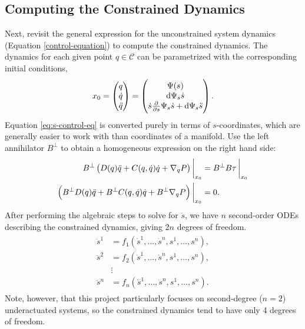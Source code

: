 \documentclass[main.tex]{subfiles}
\begin{document}
\subsection{Computing the Constrained Dynamics}
Next, revisit the general expression for the unconstrained system dynamics (Equation \ref{control-equation}) to compute the constrained dynamics. 
The dynamics for each given point $q\in\mathcal{C}$ can be parametrized with the corresponding initial conditions,
\begin{align}
x_0=\pmqty{q\\\qd\\\qdd}=\pmqty{
\Psi(s)\\
\dd\Psi_s\dot{s}\\
\dot{s}\pdv{}{s}\Psi_s\dot{s}+\dd\Psi_s\ddot{s}
}.
\end{align}
Equation \ref{eq:s-control-eq} is converted purely in terms of $s$-coordinates, which are generally easier to work with than coordinates of a manifold.
Use the left annihilator $B^\bot$ to obtain a homogeneous expression on the right hand side:
\begin{align}
B^\bot\del{
D(q)\qdd+C(q,\qd)\qd+\nabla_q P
}
\bigg|_{x_0}
&=B^\bot B\tau \,
\bigg|_{x_0}\label{eq:s-control-eq}\\
\del{B^\bot D(q)\qdd+ B^\bot C(q,\qd)\qd+ B^\bot\nabla_q P}\bigg|_{x_0}
&=0.
\end{align}
After performing the algebraic steps to solve for $\ddot s$, we have $n$ second-order ODEs describing the constrained dynamics, giving $2n$ degrees of freedom. 
\begin{align}
\begin{aligned}
\ddot s^1 &=f_1(\dot s^1,\ldots, \dot s^n, s^1,\ldots, s^n), \\ 
\ddot s^2 &=f_2(\dot s^1,\ldots, \dot s^n, s^1,\ldots, s^n),\\
&\vdots\phantom{={}}\\
\ddot s^n &=f_n(\dot s^1,\ldots, \dot s^n, s^1,\ldots, s^n).
\end{aligned}\label{eq:constr-dyn}
\end{align}
Note, however, that this project particularly focuses on second-degree ($n=2$) underactuated systems, so the constrained dynamics tend to have only 4 degrees of freedom.
\end{document}
